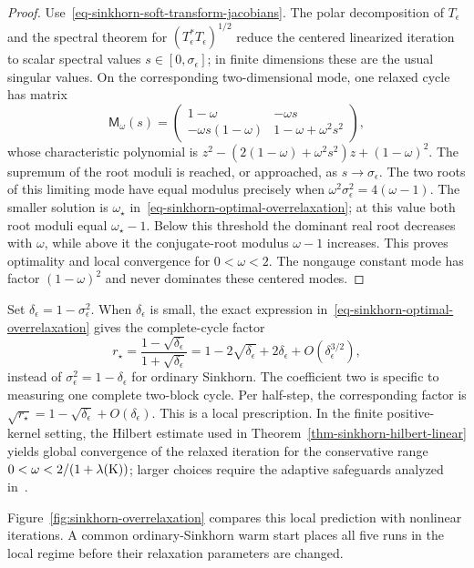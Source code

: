 \begin{proof}
	Use~\eqref{eq-sinkhorn-soft-transform-jacobians}. The polar decomposition of $T_\epsilon$ and the spectral theorem for $(T_\epsilon^*T_\epsilon)^{1/2}$ reduce the centered linearized iteration to scalar spectral values $s\in[0,\sigma_\epsilon]$; in finite dimensions these are the usual singular values. On the corresponding two-dimensional mode, one relaxed cycle has matrix
	\[
		\mathsf M_\omega(s)
		=
		\begin{pmatrix}
			1-\omega&-\omega s\\
			-\omega s(1-\omega)&1-\omega+\omega^2s^2
		\end{pmatrix},
	\]
	whose characteristic polynomial is $z^2-(2(1-\omega)+\omega^2s^2)z+(1-\omega)^2$.
	The supremum of the root moduli is reached, or approached, as $s\to\sigma_\epsilon$. The two roots of this limiting mode have equal modulus precisely when
	\(\omega^2\sigma_\epsilon^2=4(\omega-1)\).
	The smaller solution is $\omega_\star$ in~\eqref{eq-sinkhorn-optimal-overrelaxation}; at this value both root moduli equal $\omega_\star-1$. Below this threshold the dominant real root decreases with $\omega$, while above it the conjugate-root modulus $\omega-1$ increases. This proves optimality and local convergence for $0<\omega<2$.
	The nongauge constant mode has factor $(1-\omega)^2$ and never dominates these centered modes.
\end{proof}

Set $\delta_\epsilon=1-\sigma_\epsilon^2$. When $\delta_\epsilon$ is small, the exact expression in~\eqref{eq-sinkhorn-optimal-overrelaxation} gives the complete-cycle factor
\[
	r_\star
	=
	\frac{1-\sqrt{\delta_\epsilon}}{1+\sqrt{\delta_\epsilon}}
	=
	1-2\sqrt{\delta_\epsilon}
	+2\delta_\epsilon
	+O(\delta_\epsilon^{3/2}),
\]
instead of $\sigma_\epsilon^2=1-\delta_\epsilon$ for ordinary Sinkhorn. The coefficient two is specific to measuring one complete two-block cycle. Per half-step, the corresponding factor is
\(
	\sqrt{r_\star}=1-\sqrt{\delta_\epsilon}+O(\delta_\epsilon)
\).
This is a local prescription. In the finite positive-kernel setting, the Hilbert estimate used in Theorem~\ref{thm-sinkhorn-hilbert-linear} yields global convergence of the relaxed iteration for the conservative range~\cite{lehmann2022overrelaxation}
\(
	0<\omega<2/(1+\lambda(\mathrm{K}))
\);
larger choices require the adaptive safeguards analyzed in~\cite{thibault2021overrelaxed,lehmann2022overrelaxation}.

Figure~\ref{fig:sinkhorn-overrelaxation} compares this local prediction with nonlinear iterations. A common ordinary-Sinkhorn warm start places all five runs in the local regime before their relaxation parameters are changed.

